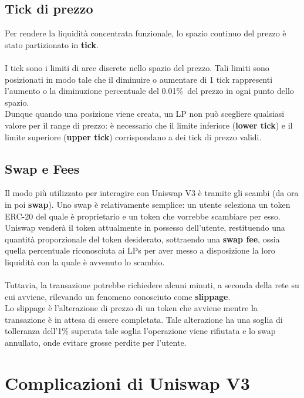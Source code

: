 \documentclass[12pt,a4paper]{report}
\begin{document}
\subsection{Tick di prezzo}

Per rendere la liquidità concentrata funzionale, lo spazio continuo del prezzo è stato partizionato in \textbf{tick}.
\\\\I tick sono i limiti di aree discrete nello spazio del prezzo. Tali limiti sono posizionati in modo tale che il diminuire o aumentare di 1 tick rappresenti l'aumento o la diminuzione percentuale del 0.01\%\ del prezzo in ogni punto dello spazio.
\\Dunque quando una posizione viene creata, un LP non può scegliere qualsiasi valore per il range di prezzo: è necessario che il limite inferiore (\textbf{lower tick}) e il limite superiore (\textbf{upper tick}) corrispondano a dei tick di prezzo validi.

\subsection{Swap e Fees}

Il modo più utilizzato per interagire con Uniswap V3 è tramite gli scambi (da ora in poi \textbf{swap}).
Uno swap è relativamente semplice: un utente seleziona un token ERC-20 del quale è proprietario e un token che vorrebbe scambiare per esso. Uniswap venderà il token attualmente in possesso dell'utente, restituendo una quantità proporzionale del token desiderato, sottraendo una \textbf{swap fee}, ossia quella percentuale riconosciuta ai LPs per aver messo a disposizione la loro liquidità con la quale è avvenuto lo scambio.
\\\\Tuttavia, la transazione potrebbe richiedere alcuni minuti, a seconda della rete su cui avviene, rilevando un fenomeno conosciuto come \textbf{slippage}.
\\Lo slippage è l'alterazione di prezzo di un token che avviene mentre la transazione è in attesa di essere completata. Tale alterazione ha una soglia di tolleranza dell'1\%\: superata tale soglia l'operazione viene rifiutata e lo swap annullato, onde evitare grosse perdite per l'utente.

\section{Complicazioni di Uniswap V3}
\end{document}
